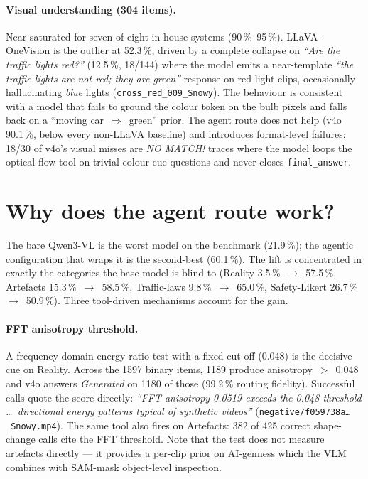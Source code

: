 \documentclass[11pt,a4paper]{article}
\newcommand{\pct}[1]{#1\,\%}
\newcommand{\code}[1]{\texttt{#1}}
\begin{document}
\paragraph{Visual understanding (304 items).} Near-saturated for seven
of eight in-house systems (\pct{90}--\pct{95}). LLaVA-OneVision is the
outlier at \pct{52.3}, driven by a complete collapse on
\emph{``Are the traffic lights red?''} (\pct{12.5}, 18/144) where the
model emits a near-template \emph{``the traffic lights are not red;
they are green''} response on red-light clips, occasionally
hallucinating \emph{blue} lights (\code{cross\_red\_009\_Snowy}). The
behaviour is consistent with a model that fails to ground the
colour token on the bulb pixels and falls back on a
``moving car~$\Rightarrow$~green'' prior. The agent route does not
help (v4o \pct{90.1}, below every non-LLaVA baseline) and introduces
format-level failures: 18/30 of v4o's visual misses are
\emph{NO MATCH!} traces where the model loops the optical-flow tool on
trivial colour-cue questions and never closes \code{final\_answer}.

\section{Why does the agent route work?}
\label{sec:agent}

The bare Qwen3-VL is the worst model on the benchmark (\pct{21.9}); the
agentic configuration that wraps it is the second-best (\pct{60.1}).
The lift is concentrated in exactly the categories the base model is
blind to (Reality \pct{3.5}~$\to$~\pct{57.5}, Artefacts
\pct{15.3}~$\to$~\pct{58.5}, Traffic-laws \pct{9.8}~$\to$~\pct{65.0},
Safety-Likert \pct{26.7}~$\to$~\pct{50.9}). Three tool-driven
mechanisms account for the gain.

\paragraph{FFT anisotropy threshold.} A frequency-domain energy-ratio
test with a fixed cut-off (0.048) is the decisive cue on Reality.
Across the 1597 binary items, 1189 produce anisotropy~$>$~0.048 and
v4o answers \emph{Generated} on 1180 of those (\pct{99.2} routing
fidelity). Successful calls quote the score directly: \emph{``FFT
anisotropy 0.0519 exceeds the 0.048 threshold \dots\ directional
energy patterns typical of synthetic videos''}
(\code{negative/f059738a\dots\_Snowy.mp4}). The same tool also fires
on Artefacts: 382 of 425 correct shape-change calls cite the FFT
threshold. Note that the test does not measure artefacts directly --- it
provides a per-clip prior on AI-genness which the VLM combines with
SAM-mask object-level inspection.
\end{document}
